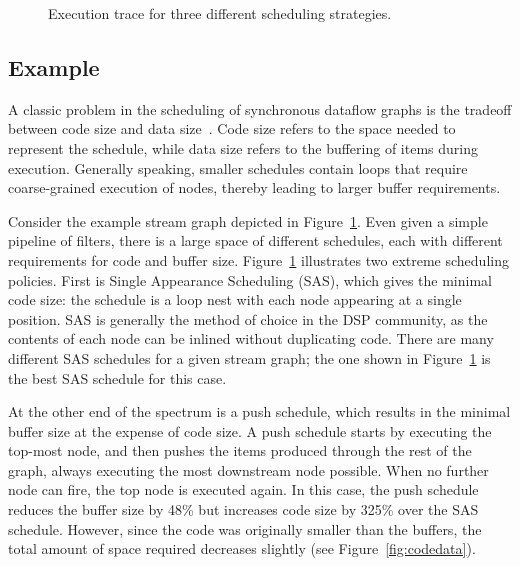 \begin{figure}[t]
\caption{Execution trace for three different scheduling
strategies.\protect\label{fig:trace}}
\vspace{-12pt}
\end{figure}

\subsection{Example}
\label{sec:sched-vs-buffer}

\begin{comment}
\begin{figure}
\begin{center}
\psfig{figure=pipeline-buffers.eps,width=0.6in} \caption[4 {\filter}
{\pipeline}]{Sample 4 {\filter} {\pipeline}.  This {\pipeline} is
the same as one in Figure \ref{fig:steady-state} (a), except that
its children do not peek extra data} \label{fig:pipeline-buffers}
\end{center}
\end{figure}
\end{comment}

A classic problem in the scheduling of synchronous dataflow graphs is
the tradeoff between code size and data size~\cite{bhat1999x1}.  Code
size refers to the space needed to represent the schedule, while data
size refers to the buffering of items during execution.  Generally
speaking, smaller schedules contain loops that require coarse-grained
execution of nodes, thereby leading to larger buffer requirements.

Consider the example stream graph depicted in Figure~\ref{fig:trace}.
Even given a simple pipeline of filters, there is a large space of
different schedules, each with different requirements for code and
buffer size.  Figure~\ref{fig:trace} illustrates two extreme
scheduling policies.  First is Single Appearance Scheduling (SAS),
which gives the minimal code size: the schedule is a loop nest with
each node appearing at a single position.  SAS is generally the method
of choice in the DSP community, as the contents of each node can be
inlined without duplicating code.  There are many different SAS
schedules for a given stream graph; the one shown in
Figure~\ref{fig:trace} is the best SAS schedule for this case.

At the other end of the spectrum is a push schedule, which results in
the minimal buffer size at the expense of code size.  A push schedule
starts by executing the top-most node, and then pushes the items
produced through the rest of the graph, always executing the most
downstream node possible.  When no further node can fire, the top node
is executed again.  In this case, the push schedule reduces the buffer
size by 48\% but increases code size by 325\% over the SAS schedule.
However, since the code was originally smaller than the buffers, the
total amount of space required decreases slightly (see
Figure~\ref{fig:codedata}).

